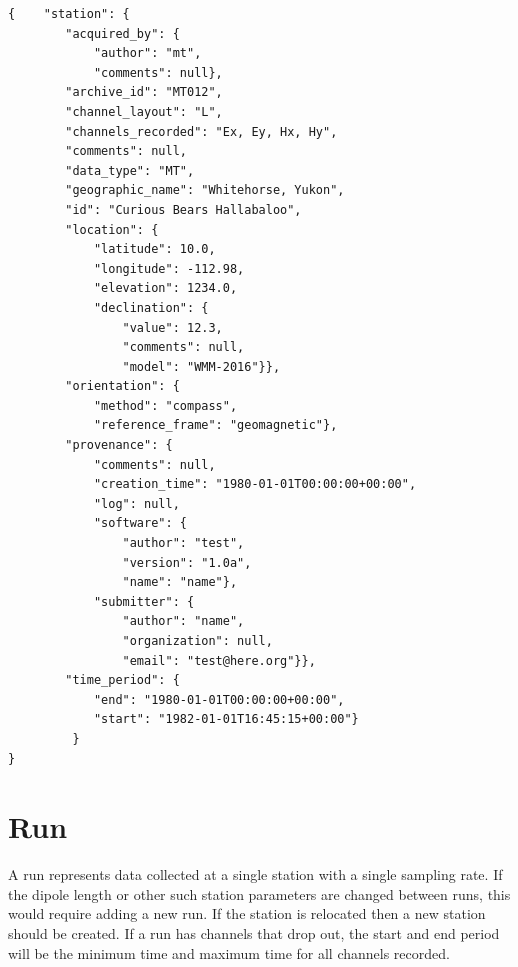 \documentclass[12pt]{article}
\begin{document}
\begin{verbatim}
{    "station": {
        "acquired_by": {
            "author": "mt",
            "comments": null},
        "archive_id": "MT012",
        "channel_layout": "L",
        "channels_recorded": "Ex, Ey, Hx, Hy",
        "comments": null,
        "data_type": "MT",
        "geographic_name": "Whitehorse, Yukon",
        "id": "Curious Bears Hallabaloo",
        "location": {
            "latitude": 10.0,
            "longitude": -112.98,
            "elevation": 1234.0,
            "declination": {
                "value": 12.3,
                "comments": null,
                "model": "WMM-2016"}},
        "orientation": {
            "method": "compass",
            "reference_frame": "geomagnetic"},
        "provenance": {
            "comments": null,
            "creation_time": "1980-01-01T00:00:00+00:00",
            "log": null,
            "software": {
                "author": "test",
                "version": "1.0a",
                "name": "name"},
            "submitter": {
                "author": "name",
                "organization": null,
                "email": "test@here.org"}},
        "time_period": {
            "end": "1980-01-01T00:00:00+00:00",
            "start": "1982-01-01T16:45:15+00:00"}
         }
}
\end{verbatim}

\newpage
\section{Run}

A run represents data collected at a single station with a single sampling rate. If the dipole length or other such station parameters are changed between runs, this would require adding a new run.  If the station is relocated then a new station should be created.  If a run has channels that drop out, the start and end period will be the minimum time and maximum time for all channels recorded.  
\end{document}
